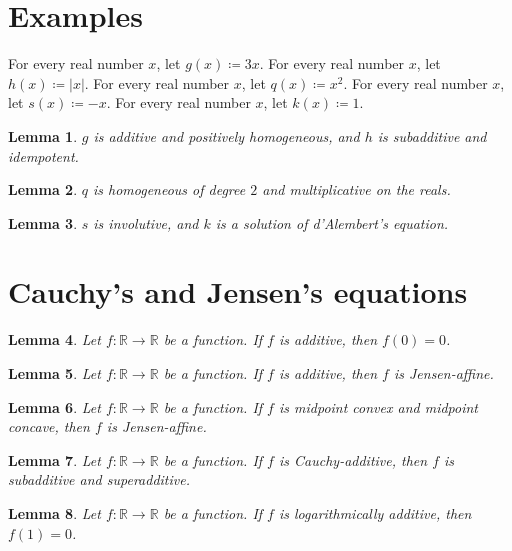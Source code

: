 \documentclass{article}
\newtheorem{lemma}{Lemma}
\begin{document}
\section{Examples}

For every real number $x$, let $g(x)\coloneqq 3x$.
For every real number $x$, let $h(x)\coloneqq |x|$.
For every real number $x$, let $q(x)\coloneqq x^2$.
For every real number $x$, let $s(x)\coloneqq -x$.
For every real number $x$, let $k(x)\coloneqq 1$.

\begin{lemma}\label{examples}
$g$ is additive and positively homogeneous, and $h$ is subadditive and idempotent.
\end{lemma}

\begin{lemma}\label{square}
$q$ is homogeneous of degree $2$ and multiplicative on the reals.
\end{lemma}

\begin{lemma}\label{involution}
$s$ is involutive, and $k$ is a solution of d'Alembert's equation.
\end{lemma}

\section{Cauchy's and Jensen's equations}

\begin{lemma}\label{zero}
Let $f:\mathbb{R}\to\mathbb{R}$ be a function. If $f$ is additive, then $f(0)=0$.
\end{lemma}

\begin{lemma}\label{jensen}
Let $f:\mathbb{R}\to\mathbb{R}$ be a function. If $f$ is additive, then $f$ is Jensen-affine.
\end{lemma}

\begin{lemma}\label{midpoint}
Let $f:\mathbb{R}\to\mathbb{R}$ be a function. If $f$ is midpoint convex and midpoint concave, then $f$ is Jensen-affine.
\end{lemma}

\begin{lemma}\label{subadditive}
Let $f:\mathbb{R}\to\mathbb{R}$ be a function. If $f$ is Cauchy-additive, then $f$ is subadditive and superadditive.
\end{lemma}

\begin{lemma}\label{logarithmic}
Let $f:\mathbb{R}\to\mathbb{R}$ be a function. If $f$ is logarithmically additive, then $f(1)=0$.
\end{lemma}
\end{document}

